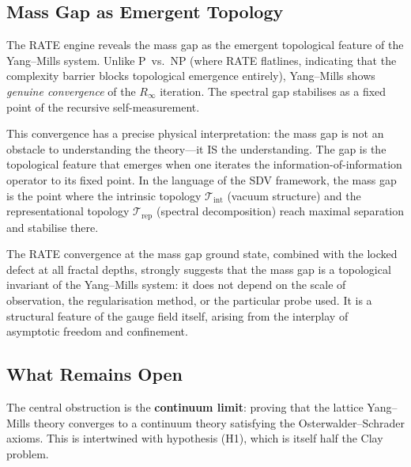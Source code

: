 \documentclass[11pt]{article}
\begin{document}
\subsection{Mass Gap as Emergent Topology}

The RATE engine reveals the mass gap as the emergent topological feature
of the Yang--Mills system.  Unlike P~vs.~NP (where RATE flatlines,
indicating that the complexity barrier blocks topological emergence
entirely), Yang--Mills shows \emph{genuine convergence} of the $R_\infty$
iteration.  The spectral gap stabilises as a fixed point of the
recursive self-measurement.

This convergence has a precise physical interpretation: the mass gap is
not an obstacle to understanding the theory---it IS the understanding.
The gap is the topological feature that emerges when one iterates the
information-of-information operator to its fixed point.  In the
language of the SDV framework, the mass gap is the point where the
intrinsic topology $\mathcal{T}_{\mathrm{int}}$ (vacuum structure) and
the representational topology $\mathcal{T}_{\mathrm{rep}}$ (spectral
decomposition) reach maximal separation and stabilise there.

The RATE convergence at the mass gap ground state, combined with the
locked defect at all fractal depths, strongly suggests that the mass gap
is a topological invariant of the Yang--Mills system: it does not depend
on the scale of observation, the regularisation method, or the
particular probe used.  It is a structural feature of the gauge field
itself, arising from the interplay of asymptotic freedom and
confinement.

\subsection{What Remains Open}

The central obstruction is the \textbf{continuum limit}: proving that
the lattice Yang--Mills theory converges to a continuum theory
satisfying the Osterwalder--Schrader axioms.  This is intertwined with
hypothesis (H1), which is itself half the Clay problem.
\end{document}
